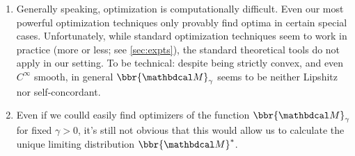 {\begin{enumerate}[nosep, label=\textbf{D\arabic*.}]
        \item Generally speaking, optimization is computationally difficult.
            Even our most powerful optimization techniques only provably find optima in certain special cases.
        Unfortunately, while standard optimization techniques seem to work in practice
          (more or less; see \cref{sec:expts}), the standard theoretical
          tools do not apply in our setting.
            To be technical: despite being strictly convex,
            and even $C^\infty$ smooth,
            in general $\bbr{\dg M}_\gamma$ seems to be neither Lipshitz nor self-concordant.
        \item Even if we coulld easily find optimizers of the function $\bbr{\dg M}_\gamma$ for fixed $\gamma > 0$, it's still not obvious that this would allow us to calculate the unique limiting distribution $\bbr{\dg M}^*$.
    \end{enumerate}

}
